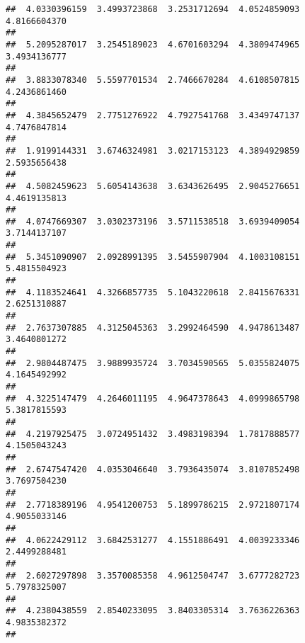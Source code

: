 \documentclass[]{article}
\begin{document}
\begin{verbatim}
##  4.0330396159  3.4993723868  3.2531712694  4.0524859093  4.8166604370 
##                                                                       
##  5.2095287017  3.2545189023  4.6701603294  4.3809474965  3.4934136777 
##                                                                       
##  3.8833078340  5.5597701534  2.7466670284  4.6108507815  4.2436861460 
##                                                                       
##  4.3845652479  2.7751276922  4.7927541768  3.4349747137  4.7476847814 
##                                                                       
##  1.9199144331  3.6746324981  3.0217153123  4.3894929859  2.5935656438 
##                                                                       
##  4.5082459623  5.6054143638  3.6343626495  2.9045276651  4.4619135813 
##                                                                       
##  4.0747669307  3.0302373196  3.5711538518  3.6939409054  3.7144137107 
##                                                                       
##  5.3451090907  2.0928991395  3.5455907904  4.1003108151  5.4815504923 
##                                                                       
##  4.1183524641  4.3266857735  5.1043220618  2.8415676331  2.6251310887 
##                                                                       
##  2.7637307885  4.3125045363  3.2992464590  4.9478613487  3.4640801272 
##                                                                       
##  2.9804487475  3.9889935724  3.7034590565  5.0355824075  4.1645492992 
##                                                                       
##  4.3225147479  4.2646011195  4.9647378643  4.0999865798  5.3817815593 
##                                                                       
##  4.2197925475  3.0724951432  3.4983198394  1.7817888577  4.1505043243 
##                                                                       
##  2.6747547420  4.0353046640  3.7936435074  3.8107852498  3.7697504230 
##                                                                       
##  2.7718389196  4.9541200753  5.1899786215  2.9721807174  4.9055033146 
##                                                                       
##  4.0622429112  3.6842531277  4.1551886491  4.0039233346  2.4499288481 
##                                                                       
##  2.6027297898  3.3570085358  4.9612504747  3.6777282723  5.7978325007 
##                                                                       
##  4.2380438559  2.8540233095  3.8403305314  3.7636226363  4.9835382372 
##                                                                       

\end{verbatim}
\end{document}
